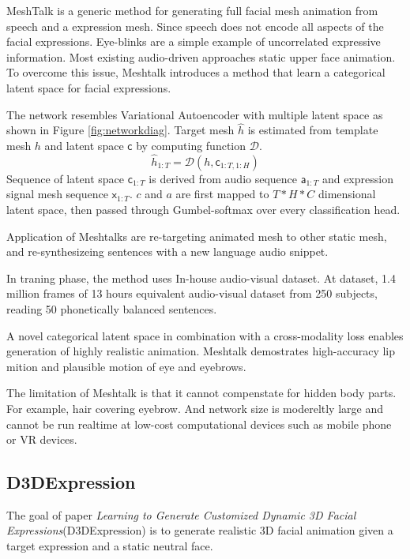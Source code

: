 \documentclass[10pt,twocolumn,letterpaper]{article}
\begin{document}
MeshTalk is a generic method for generating full facial mesh animation from speech and a expression mesh. Since speech does not encode all aspects of the facial expressions. Eye-blinks are a simple example of uncorrelated expressive information. Most existing audio-driven approaches static upper face animation. To overcome this issue, Meshtalk introduces a method that learn a categorical latent space for facial expressions.

The network resembles Variational Autoencoder with multiple latent space as shown in Figure \ref{fig:networkdiag}.
Target mesh \(\hat{h}\) is estimated from template mesh \(h\) and latent space \(\mathsf{c}\) by computing function \(\mathcal{D}\).
\begin{equation}
  \hat{h}_{1:T} = \mathcal{D}(h, \mathsf{c}_{1:T, 1:H})
  \label{eq:1}
\end{equation}
Sequence of latent space \(\mathsf{c}_{1:T}\) is derived from audio sequence \(\mathsf{a}_{1:T}\) and expression signal mesh sequence \(\mathsf{x}_{1:T}\).
\(c\) and \(a\) are first mapped to \(T*H*C\) dimensional latent space, then passed through Gumbel-softmax\cite{jangCategoricalReparameterizationGumbelSoftmax2017} over every classification head.

Application of Meshtalks are re-targeting animated mesh to other static mesh, and re-synthesizeing sentences with a new language audio snippet.

In traning phase, the method uses In-house audio-visual dataset. At dataset, 1.4 million frames of 13 hours equivalent audio-visual dataset from 250 subjects, reading 50 phonetically balanced sentences.


A novel categorical latent space in combination with a cross-modality loss enables generation of highly realistic animation. Meshtalk demostrates high-accuracy lip mition and plausible motion of eye and eyebrows.

The limitation of Meshtalk is that it cannot compenstate for hidden body parts. For example, hair covering eyebrow. And network size is modereltly large and cannot be run realtime at low-cost computational devices such as mobile phone or VR devices.

\subsection{D3DExpression}


The goal of paper \emph{Learning to Generate Customized Dynamic 3D Facial Expressions}(D3DExpression) is to generate realistic 3D facial animation given a target expression and a static neutral face.
\end{document}
